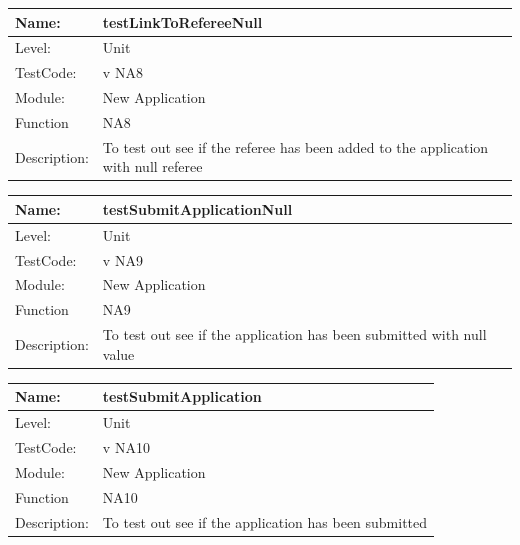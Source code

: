 \documentclass[12pt]{article}
\begin{document}
\begin{center}
\begin{tabular}{|l|p{12cm}|}
\hline

 Name: & testLinkToRefereeNull  \\
\hline
Level: & Unit \\
\hline
TestCode: & v NA8 \\
\hline
Module:& New Application\\
\hline
Function & NA8 \\
\hline
Description: & To test out see if the referee has been added to the application with null referee  \\
\hline

\end{tabular}
\end{center}

\begin{center}
\begin{tabular}{|l|p{12cm}|}
\hline

 Name: & testSubmitApplicationNull  \\
\hline
Level: & Unit \\
\hline
TestCode: & v NA9 \\
\hline
Module:& New Application\\
\hline
Function & NA9 \\
\hline
Description: & To test out see if the application has been submitted with null value  \\
\hline

\end{tabular}
\end{center}


\begin{center}
\begin{tabular}{|l|p{12cm}|}
\hline

 Name: & testSubmitApplication \\
\hline
Level: & Unit \\
\hline
TestCode: & v NA10 \\
\hline
Module:& New Application\\
\hline
Function & NA10 \\
\hline
Description: & To test out see if the application has been submitted   \\
\hline

\end{tabular}
\end{center}
\end{document}
